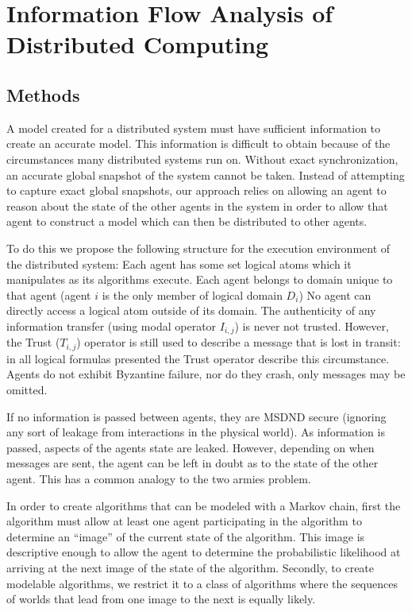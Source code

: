 

\chapter{Information Flow Analysis of Distributed Computing}


\section{Methods}

A model created for a distributed system must have sufficient information to create an accurate model. This information is difficult to obtain because of the circumstances many distributed systems run on. Without exact synchronization, an accurate global snapshot of the system cannot be taken. Instead of attempting to capture exact global snapshots, our approach relies on allowing an agent to reason about the state of the other agents in the system in order to allow that agent to construct a model which can then be distributed to other agents.


To do this we propose the following structure for the execution environment of the distributed system:
Each agent has some set logical atoms which it manipulates as its algorithms execute.
Each agent belongs to domain unique to that agent (agent $i$ is the only member of logical domain $D_i$)
No agent can directly access a logical atom outside of its domain.
The authenticity of any information transfer (using modal operator $I_{i,j}$) is never not trusted. However, the Trust ($T_{i,j}$) operator is still used to describe a message that is lost in transit: in all logical formulas presented the Trust operator describe this circumstance.
Agents do not exhibit Byzantine failure, nor do they crash, only messages may be omitted.

If no information is passed between agents, they are MSDND secure (ignoring any sort of leakage from interactions in the physical world). As information is passed, aspects of the agents state are leaked. However, depending on when messages are sent, the agent can be left in doubt as to the state of the other agent. This has a common analogy to the two armies problem. 

In order to create algorithms that can be modeled with a Markov chain, first the algorithm must allow at least one agent participating in the algorithm to determine an ``image'' of the current state of the algorithm. This image is descriptive enough to allow the agent to determine the probabilistic likelihood at arriving at the next image of the state of the algorithm. Secondly, to create modelable algorithms, we restrict it to a class of algorithms where the sequences of worlds that lead from one image to the next is equally likely.

